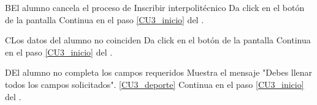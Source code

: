 \begin{UCtrayectoriaA}{B}{El alumno cancela el proceso de Inscribir interpolitécnico}
	\UCpaso[\UCactor] Da click en el botón  de la pantalla 
	\UCpaso  Continua en el paso \ref{CU3_inicio} del .
\end{UCtrayectoriaA}

\begin{UCtrayectoriaA}{C}{Los datos del alumno no coinciden}
	\UCpaso[\UCactor] Da click en el botón  de la pantalla 
	\UCpaso Continua en el paso \ref{CU3_inicio} del .
\end{UCtrayectoriaA}

\begin{UCtrayectoriaA}{D}{El alumno no completa los campos requeridos}
	\UCpaso Muestra el mensaje "Debes llenar todos los campos solicitados". \ref{CU3_deporte}
	\UCpaso Continua en el paso \ref{CU3_inicio} del .
\end{UCtrayectoriaA}